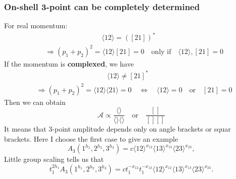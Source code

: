 \documentclass{beamer}
\newcommand{\avg}[1]{\langle #1 \rangle}
\newcommand{\mdavg}[2]{\langle #1 \rangle\!\langle #2 \rangle}
\newcommand{\cbrak}[2]{\avg{#1}\![#2]}
\begin{document}
\begin{frame}
    \frametitle{ On-shell 3-point can be completely determined}
    For real momentum:
    \begin{align*}
        &\qquad \qquad \qquad\qquad \avg{12}=([21])^* \\
        &\Rightarrow (p_1+p_2)^2=\cbrak{12}{21}=0\quad \text{only if}\quad \avg{12},[21]=0
    \end{align*}
    If the momentum is \textbf{complexed}, we have 
    \begin{align*}
        &\qquad\qquad\qquad\qquad\qquad\avg{12}\neq[21]^*\\
        &\Rightarrow (p_1+p_2)^2=\mdavg{12}{21}=0 \quad\Longleftrightarrow \quad \avg{12}=0\quad \text{or} \quad [21]=0
    \end{align*}
    Then we can obtain
    \begin{equation*}
        \mathcal{A}\propto \frac{\avg{}}{\avg{}\avg{}}\quad \text{or}\quad \frac{[]}{[][]}
    \end{equation*}
    It means that 3-point amplitude depends only on angle brackets or squar brackets. Here I choose the first case to give an example
    \begin{equation*}
        A_3(1^{h_1},2^{h_2},3^{h_3})=c\avg{12}^{x_{12}}\avg{13}^{x_{13}}\avg{23}^{x_{23}},
    \end{equation*}
    Little group scaling tells us that
    \begin{equation*}
        t_1^{2h_1} A_3(1^{h_1},2^{h_2},3^{h_3})=ct_1^{-x_{12}}t_1^{-x_{13}}\avg{12}^{x_{12}}\avg{13}^{x_{13}}\avg{23}^{x_{23}}.
    \end{equation*}
\end{frame}
\end{document}
